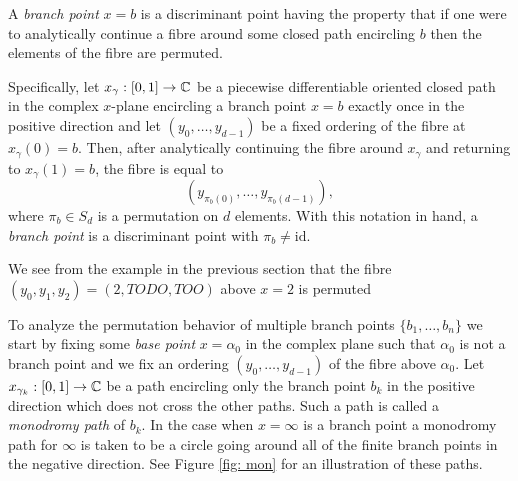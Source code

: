 A {\it branch point} $x = b$ is a discriminant point having the property that if
one were to analytically continue a fibre around some closed path encircling $b$
then the elements of the fibre are permuted.

Specifically, let $x_{\gamma} : [0,1] \to \operatorname{\mathbb{C}}$ be a piecewise differentiable
oriented closed path in the complex $x$-plane encircling a branch point $x=b$
exactly once in the positive direction and let $(y_0, \ldots, y_{d-1})$ be a
fixed ordering of the fibre at $x_\gamma(0) = b$. Then, after analytically
continuing the fibre around $x_\gamma$ and returning to $x_\gamma(1) = b$, the
fibre is equal to
\begin{equation} \label{eq:permuted-fiber}
    (y_{\pi_b(0)}, \ldots, y_{\pi_b(d-1)}),
\end{equation}
where $\pi_b \in S_d$ is a permutation on $d$ elements. With this notation in
hand, a {\it branch point} is a discriminant point with $\pi_b \neq \text{id}$.

\begin{example}
  We see from the example in the previous section that the fibre $(y_0, y_1,
  y_2) = (2, TODO, TOO)$ above $x=2$ is permuted
\end{example}

To analyze the permutation behavior of multiple branch points
$\{b_1,\ldots,b_n\}$ we start by fixing some {\it base point} $x=\alpha_0$ in
the complex plane such that $\alpha_0$ is not a branch point and we fix an
ordering $(y_0,\ldots,y_{d-1})$ of the fibre above $\alpha_0$. Let $x_{\gamma_k}
: [0,1] \to \operatorname{\mathbb{C}}$ be a path encircling only the branch point $b_k$ in the
positive direction which does not cross the other paths. Such a path is called a
{\it monodromy path} of $b_k$. In the case when $x = \infty$ is a branch point a
monodromy path for $\infty$ is taken to be a circle going around all of the
finite branch points in the negative direction. See Figure \ref{fig: mon} for an
illustration of these paths.

